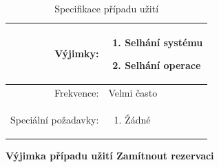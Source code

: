 \begin{center}
\begin{table}[ht!]
{\begin{tabular}{| r | p{12cm} |}
    Výjimky: & 
    \begin{minipage}[t]{0.75\textwidth}
    	\begin{enumerate}[nosep,after=\strut]
    		\item Selhání systému
    		\item Selhání operace
    	\end{enumerate}
  	\end{minipage} \\
    \hline
    Frekvence: & Velmi často \\
    \hline
    Speciální požadavky: & 
    \begin{minipage}[t]{0.75\textwidth}
    	\begin{enumerate}[nosep,after=\strut]
    		\item Žádné
    	\end{enumerate}
  	\end{minipage} \\
    \hline

\end{tabular}}
\caption{Specifikace případu užití }
\label{table:5}
\end{table}
\end{center}

\newpage
\textbf{Výjimka případu užití \textbf{Zamítnout rezervaci}}

